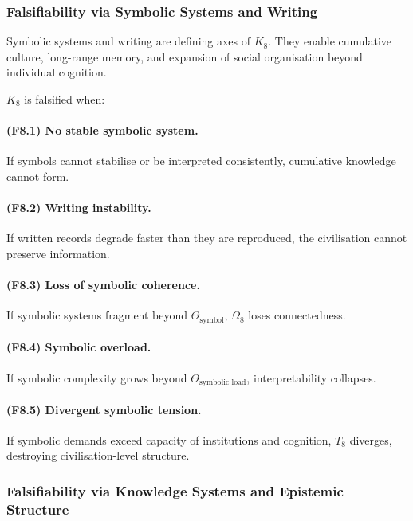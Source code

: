 \subsubsection{Falsifiability via Symbolic Systems and Writing}

Symbolic systems and writing are defining axes of $K_8$.
They enable cumulative culture, long-range memory,
and expansion of social organisation beyond individual cognition.

$K_8$ is falsified when:

\paragraph{(F8.1) No stable symbolic system.}
If symbols cannot stabilise or be interpreted consistently,
cumulative knowledge cannot form.

\paragraph{(F8.2) Writing instability.}
If written records degrade faster than they are reproduced,
the civilisation cannot preserve information.

\paragraph{(F8.3) Loss of symbolic coherence.}
If symbolic systems fragment beyond $\Theta_{\mathrm{symbol}}$,
$\Omega_8$ loses connectedness.

\paragraph{(F8.4) Symbolic overload.}
If symbolic complexity grows beyond $\Theta_{\mathrm{symbolic\_load}}$,
interpretability collapses.

\paragraph{(F8.5) Divergent symbolic tension.}
If symbolic demands exceed capacity of institutions and cognition,
$T_8$ diverges, destroying civilisation-level structure.



\subsubsection{Falsifiability via Knowledge Systems and Epistemic Structure}

